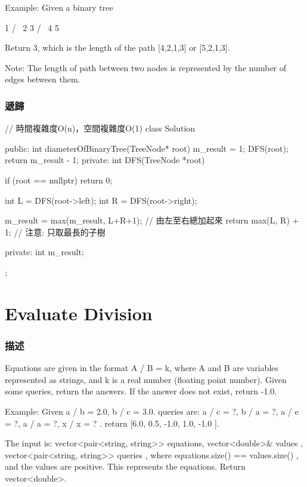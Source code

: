 Example:
Given a binary tree
\begin{Code}
          1
         / \
        2   3
       / \     
      4   5    

Return 3, which is the length of the path [4,2,1,3] or [5,2,1,3].

Note: The length of path between two nodes is represented by the number of edges between them.
\end{Code}


\subsubsection{遞歸}
\begin{Code}
// 時間複雜度O(n)，空間複雜度O(1)
class Solution {
public:
    int diameterOfBinaryTree(TreeNode* root) {
        m_result = 1;
        DFS(root);
        return m_result - 1;
    }
private:
    int DFS(TreeNode *root)
    {
        if (root == nullptr) return 0;

        int L = DFS(root->left);
        int R = DFS(root->right);

        m_result = max(m_result, L+R+1); // 由左至右總加起來
        return max(L, R) + 1; // 注意: 只取最長的子樹
    }
private:
    int m_result;
};
\end{Code}

\section{Evaluate Division} %
\label{sec:evaluate-division}


\subsubsection{描述}
Equations are given in the format A / B = k, where A and B are variables represented as strings, and k is a real number (floating point number). Given some queries, return the answers. If the answer does not exist, return -1.0.

Example:
Given a / b = 2.0, b / c = 3.0.
queries are: a / c = ?, b / a = ?, a / e = ?, a / a = ?, x / x = ? .
return [6.0, 0.5, -1.0, 1.0, -1.0 ].

\begin{Code}
  The input is: vector<pair<string, string>> equations, vector<double>& values
  , vector<pair<string, string>> queries , where equations.size() == values.size()
  , and the values are positive. This represents the equations. Return vector<double>.
\end{Code}

